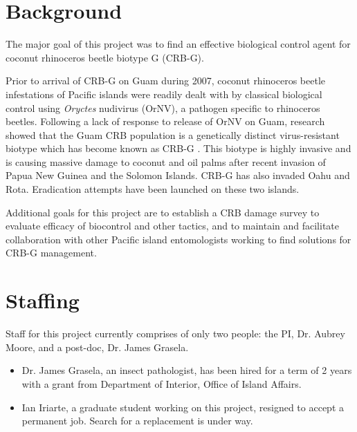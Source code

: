 \documentclass[12pt,letterpaper,english,bibliography=totocnumbered]{scrartcl}
\begin{document}
\newpage
\tableofcontents{}

\newpage

\section{Background}

The major goal of this project was to find an effective biological
control agent for coconut rhinoceros beetle biotype G (CRB-G).

Prior to arrival of CRB-G on Guam during 2007, coconut rhinoceros beetle
infestations of Pacific islands were readily dealt with by classical
biological control using \textit{Oryctes} nudivirus (OrNV), a pathogen specific to rhinoceros beetles. 
Following a lack
of response to release of OrNV on Guam, research showed that the Guam
CRB population is a genetically distinct virus-resistant biotype which
has become known as CRB-G \cite{marshall_new_2017-1}. This biotype is highly invasive and is
causing massive damage to coconut and oil palms after recent invasion of Papua New Guinea
and the Solomon Islands. CRB-G has also invaded Oahu and Rota. Eradication
attempts have been launched on these two islands.

Additional goals for this project are to establish a CRB damage survey to evaluate efficacy of biocontrol and other tactics, and to maintain and facilitate collaboration with other Pacific island entomologists working to find solutions for CRB-G management.


\section{Staffing}

Staff for this project currently comprises of only two people: the PI, Dr. Aubrey Moore, and a post-doc, Dr. James Grasela.
\begin{itemize}

    \item Dr. James Grasela, an insect pathologist, has been hired for a term of 2 years with a grant from Department of Interior, Office of Island Affairs.

    \item Ian Iriarte, a graduate student working on this project, resigned to accept a permanent job. Search for a replacement is under way.

\end{itemize}

\clearpage
\end{document}
